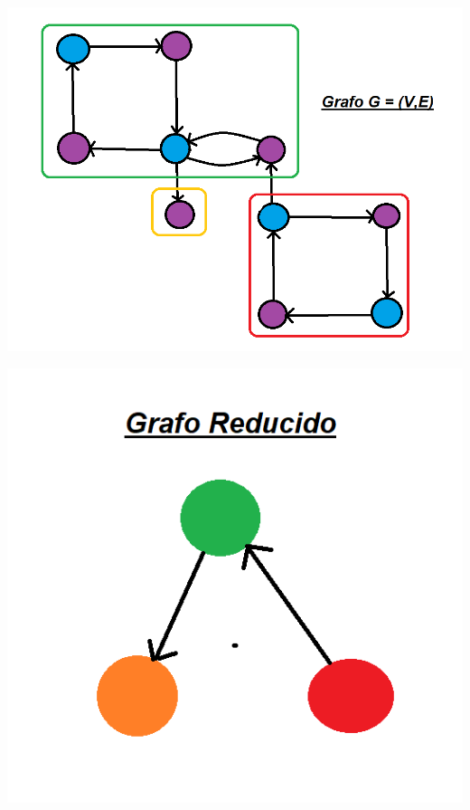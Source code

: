 \documentclass[a4paper,12pt]{article}
\begin{document}
\begin{enumerate}
\begin{flushleft}
\begin{center}
\par \includegraphics[scale=0.7]{p3} \par
\end{center}

\begin{center}
\par \includegraphics[scale=0.7]{p4} \par
\end{center}


\end{flushleft}
\end{enumerate}
\end{document}
